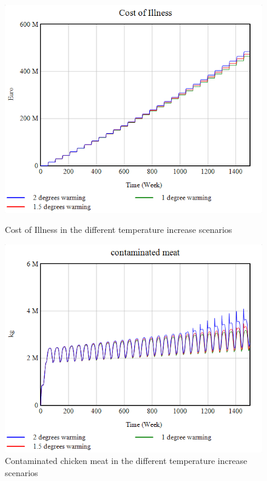 \begin{figure}[h!]
    \centering
    \begin{minipage}{0.45\textwidth}
        \centering
        \includegraphics[width=1\textwidth]{images/sensitivity/Temperature projection COI.png} %
        \caption{Cost of Illness in the different temperature increase scenarios}
        \label{fig:temp_coi}
    \end{minipage}\hfill
    \begin{minipage}{0.45\textwidth}
        \centering
        \includegraphics[width=1\textwidth]{images/sensitivity/Temperature projection contaminated meat.png} %
        \caption{Contaminated chicken meat in the different temperature increase scenarios}
        \label{fig:temp_meat}
    \end{minipage}
\end{figure}

